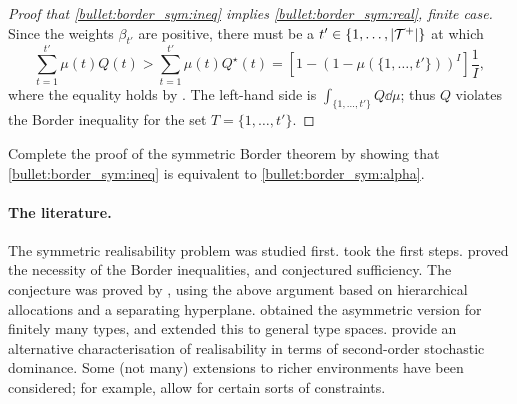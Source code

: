 \begin{proof}[Proof that \ref{bullet:border_sym:ineq} implies \ref{bullet:border_sym:real}, finite case]
	Since the weights $\beta_{t'}$ are positive,
	there must be a $t' \in \{1,\dots,\abs*{\mathcal{T}^+}\}$ at which
	\begin{equation*}
		\sum_{t=1}^{t'} \mu(t) Q(t)
		> \sum_{t=1}^{t'} \mu(t) Q^\star(t) 
		= \left[ 1 - \left( 1 - \mu(\{1,\dots,t'\}) \right)^I \right]
		\frac{1}{I} ,
	\end{equation*}
	where the equality holds by .
	The left-hand side
	is $\int_{\{1,\dots,t'\}} Q \dd \mu$;
	thus $Q$ violates the Border inequality for the set $T = \{1,\dots,t'\}$.
\end{proof}

\begin{exercise}
	\label{exercise:border_ineq_alpha}
	Complete the proof of the symmetric Border theorem by showing that \ref{bullet:border_sym:ineq} is equivalent to \ref{bullet:border_sym:alpha}.
\end{exercise}


\paragraph{The literature.}
The symmetric realisability problem was studied first.
\textcite{MaskinRiley1984} took the first steps.
\textcite{Matthews1984} proved the necessity of the Border inequalities, and conjectured sufficiency.
The conjecture was proved by \textcite{Border1991}, using the above argument based on hierarchical allocations and a separating hyperplane.
\textcite{Border2007} obtained the asymmetric version for finitely many types,
and \textcite{Mierendorff2011} extended this to general type spaces.
\textcite{HartReny2015border} provide an alternative characterisation of realisability in terms of second-order stochastic dominance.
Some (not many) extensions to richer environments have been considered; for example, \textcite{CheKimMierendorff2013} allow for certain sorts of constraints.



